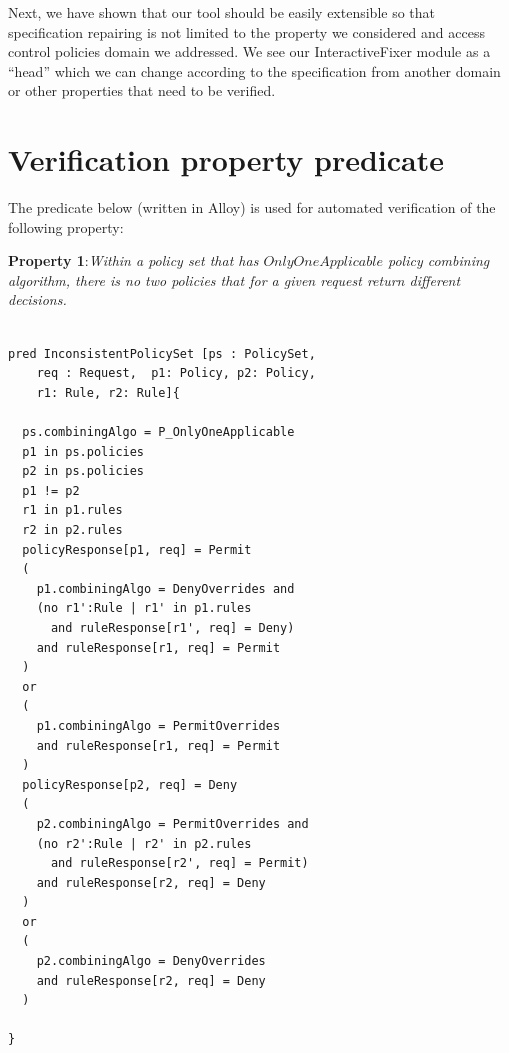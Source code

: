 \documentclass[letterpaper]{acm_proc_article-sp}
\begin{document}
Next, we have shown that our tool should be easily extensible so that specification repairing is not limited to the property we considered and access control policies domain we addressed. We see our InteractiveFixer module as a ``head'' which we can change according to the specification from another domain or other properties that need to be verified. 


{}


\appendix
\section{Verification property predicate} \label{appendix:A}

The predicate below (written in Alloy) is used for automated verification of the following property:

\textbf{Property 1}:\textit{Within a policy set that has $OnlyOneApplicable$ policy combining algorithm, there is no two policies that for a given request return different decisions.}

\begin{verbatim}

pred InconsistentPolicySet [ps : PolicySet, 
    req : Request,  p1: Policy, p2: Policy, 
    r1: Rule, r2: Rule]{

  ps.combiningAlgo = P_OnlyOneApplicable 
  p1 in ps.policies
  p2 in ps.policies
  p1 != p2
  r1 in p1.rules
  r2 in p2.rules
  policyResponse[p1, req] = Permit
  (
    p1.combiningAlgo = DenyOverrides and
    (no r1':Rule | r1' in p1.rules 
      and ruleResponse[r1', req] = Deny)
    and ruleResponse[r1, req] = Permit
  )
  or
  (
    p1.combiningAlgo = PermitOverrides
    and ruleResponse[r1, req] = Permit
  )
  policyResponse[p2, req] = Deny
  (
    p2.combiningAlgo = PermitOverrides and
    (no r2':Rule | r2' in p2.rules 
      and ruleResponse[r2', req] = Permit)
    and ruleResponse[r2, req] = Deny
  )
  or
  (
    p2.combiningAlgo = DenyOverrides
    and ruleResponse[r2, req] = Deny
  )

}

\end{verbatim}



\balancecolumns
\end{document}
